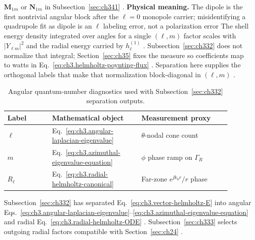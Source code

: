 \(\mathbf{M}_{1m}\) or \(\mathbf{N}_{1m}\) in Subsection~\ref{sec:ch341} .
\textbf{Physical meaning.} The dipole is the first nontrivial angular block after the \(\ell=0\) monopole carrier;
misidentifying a quadrupole fit as dipole is an \(\ell\) labeling error, not a polarization error
The shell energy density integrated over angles for a single \((\ell,m)\) factor scales with
\(|Y_{\ell m}|^{2}\) and the radial energy carried by \(h_{\ell}^{(1)}\) . Subsection~\ref{sec:ch332}
does not normalize that integral; Section~\ref{sec:ch35} fixes the measure so coefficients map to watts in
Eq.~\eqref{eq:ch3.helmholtz-poynting-flux} . Separation here supplies the
orthogonal labels that make that normalization block-diagonal in \((\ell,m)\) .
\begin{table}[t]
\centering
\caption{Angular quantum-number diagnostics used with Subsection~\ref{sec:ch332} separation outputs.}
\label{tab:ch3.332-quantum-diagnostics}
\small
\begin{tabular}{@{}p{0.18\linewidth}p{0.36\linewidth}p{0.36\linewidth}@{}}
\toprule
Label & Mathematical object & Measurement proxy \\
\midrule
\(\ell\) &
Eq.~\eqref{eq:ch3.angular-laplacian-eigenvalue} &
\(\theta\)-nodal cone count \\
\addlinespace
\(m\) &
Eq.~\eqref{eq:ch3.azimuthal-eigenvalue-equation} &
\(\phi\) phase ramp on \(\Gamma_R\) \\
\addlinespace
\(R_\ell\) &
Eq.~\eqref{eq:ch3.radial-helmholtz-canonical} &
Far-zone \(e^{\jj k_0r}/r\) phase \\
\bottomrule
\end{tabular}
\end{table}
Subsection~\ref{sec:ch332} has separated Eq.~\eqref{eq:ch3.vector-helmholtz-E} into angular
Eqs.~\eqref{eq:ch3.angular-laplacian-eigenvalue}--\eqref{eq:ch3.azimuthal-eigenvalue-equation} and radial
Eq.~\eqref{eq:ch3.radial-helmholtz-ODE} . Subsection~\ref{sec:ch333} selects
outgoing radial factors compatible with Section~\ref{sec:ch24} .
